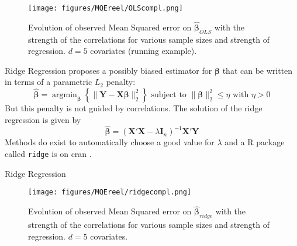 \documentclass[11pt]{beamer}
\begin{document}
	\begin{frame}
	\begin{figure}
	 \centering
	  \texttt{[image: figures/MQEreel/OLScompl.png]}
	  \caption{Evolution of observed Mean Squared error on $\hat{\boldsymbol{\beta}}_{OLS}$ with the strength of the correlations for various sample sizes and strength of regression. $d=5$ covariates (running example). } \label{MQEOLScompl}
	\end{figure}	
\end{frame}		
		\begin{frame}{Ridge Regression}
		\cite{hoerl1970ridge,marquardt1975ridge} proposes a possibly biased estimator for $\boldsymbol{\beta}$ that can be written in terms of a parametric $L_2$ penalty:
	\begin{equation}
		 \boldsymbol{\hat{\beta}}=\operatorname{argmin}_{\boldsymbol{\beta}} \left\lbrace \parallel \boldsymbol{Y}-\boldsymbol{X\beta}\parallel_2^2 \right\rbrace \textrm{ subject to } \parallel \boldsymbol{\beta} \parallel_2^2\leq \eta \textrm{ with } \eta>0
	\end{equation}
	But this penalty is not guided by correlations. 
	The solution of the ridge regression is given by
	\begin{equation}
		 \hat{\boldsymbol{\beta}}=\left(\boldsymbol{X}'\boldsymbol{X} -\lambda\boldsymbol{I}_n\right) ^{-1}\boldsymbol{X}'\boldsymbol{Y}\label{betaridge}
	\end{equation}
 Methods do exist to automatically choose a good value for $\lambda$ \cite{cule2013ridge,er2013systematic} and a R package called {\tt ridge} is on {\sc cran} \cite{packageridge}.
		\end{frame}
		
		\begin{frame}{Ridge Regression}
 \begin{figure}
	 \centering
	  \texttt{[image: figures/MQEreel/ridgecompl.png]}
	  \caption{Evolution of observed Mean Squared error on $\hat{\boldsymbol{\beta}}_{ridge}$ with the strength of the correlations for various sample sizes and strength of regression. $d=5$ covariates. } \label{MQEridgecompl}
	\end{figure}
			\end{frame}
		
\end{document}
